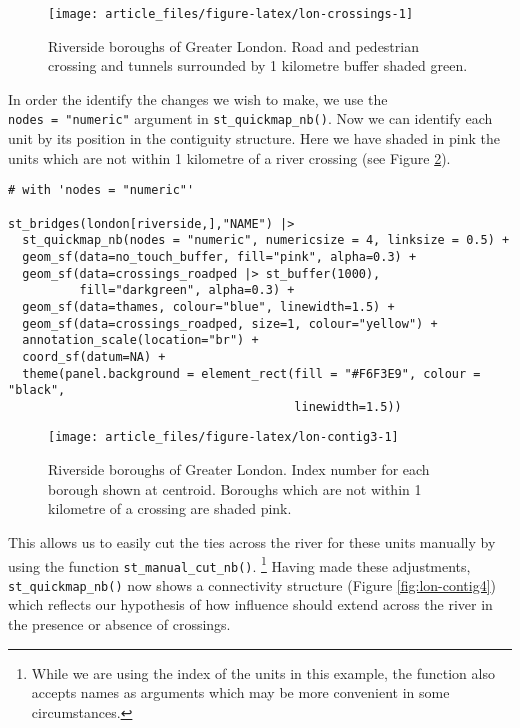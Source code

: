 \begin{figure}

{\centering \texttt{[image: article\_files/figure-latex/lon-crossings-1]} 

}

\caption{Riverside boroughs of Greater London. Road and pedestrian crossing and tunnels surrounded by 1 kilometre buffer shaded green. }\label{fig:lon-crossings}
\end{figure}

In order the identify the changes we wish to make, we use the
\texttt{nodes\ =\ "numeric"} argument in \texttt{st\_quickmap\_nb()}. Now we can identify
each unit by its position in the contiguity structure. Here we have
shaded in pink the units which are not within 1 kilometre of a river
crossing (see Figure \ref{fig:lon-contig3}).

\begin{verbatim}
# with 'nodes = "numeric"'

st_bridges(london[riverside,],"NAME") |> 
  st_quickmap_nb(nodes = "numeric", numericsize = 4, linksize = 0.5) +
  geom_sf(data=no_touch_buffer, fill="pink", alpha=0.3) + 
  geom_sf(data=crossings_roadped |> st_buffer(1000), 
          fill="darkgreen", alpha=0.3) +
  geom_sf(data=thames, colour="blue", linewidth=1.5) + 
  geom_sf(data=crossings_roadped, size=1, colour="yellow") + 
  annotation_scale(location="br") +
  coord_sf(datum=NA) + 
  theme(panel.background = element_rect(fill = "#F6F3E9", colour = "black", 
                                        linewidth=1.5))
\end{verbatim}

\begin{figure}

{\centering \texttt{[image: article\_files/figure-latex/lon-contig3-1]} 

}

\caption{Riverside boroughs of Greater London. Index number for each borough shown at centroid. Boroughs which are not within 1 kilometre of a crossing are shaded pink. }\label{fig:lon-contig3}
\end{figure}

This allows us to easily cut the ties across the river for these units
manually by using the function \texttt{st\_manual\_cut\_nb()}. \footnote{While we are using the index of the units in this example, the function also
  accepts names as arguments which may be more convenient in some circumstances.} Having made these adjustments,
\texttt{st\_quickmap\_nb()} now shows a connectivity structure (Figure \ref{fig:lon-contig4}) which reflects our hypothesis of how influence should extend across the river in the presence or absence of crossings.

